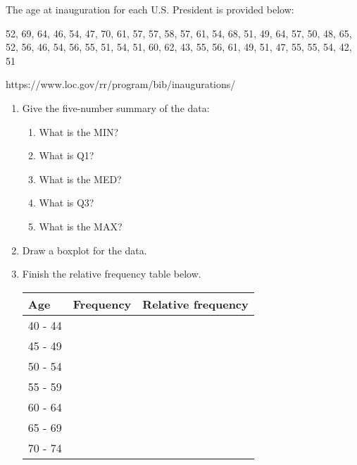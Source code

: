 \documentclass[11pt]{book}\usepackage[]{graphicx}\usepackage[]{color}
\begin{document}
\begin{exercises}
\begin{exercise}
\begin{center}
\end{center}

The age at inauguration for each U.S. President is provided below:

52, 69, 64, 46, 54, 47, 70, 61, 57, 57, 58, 57, 61, 54, 68, 51, 49, 64, 57, 50, 48, 65, 52, 56, 46, 54, 56, 55, 51, 54, 51, 60, 62, 43, 55, 56, 61, 49, 51, 47, 55, 55, 54, 42, 51

https://www.loc.gov/rr/program/bib/inaugurations/


\begin{enumerate}
  \item Give the five-number summary of the data:
  {\small{
    \begin{enumerate}
    \item What is the MIN?
    \item What is Q1?
    \item What is the MED?
    \item What is Q3?
    \item What is the MAX?
    \end{enumerate}
  }}
    \item Draw a boxplot for the data.
    \item Finish the relative frequency table below.

{\small{
\begin{tabular}{@{} lcc @{}} \hline
Age & Frequency & Relative frequency \\ \hline
40 - 44 & & \\
45 - 49 & & \\
50 - 54 & & \\
55 - 59 & & \\
60 - 64 & & \\
65 - 69 & & \\
70 - 74 & & \\
\end{tabular}
}}


\end{enumerate}
\end{exercise}
\end{exercises}
\end{document}
